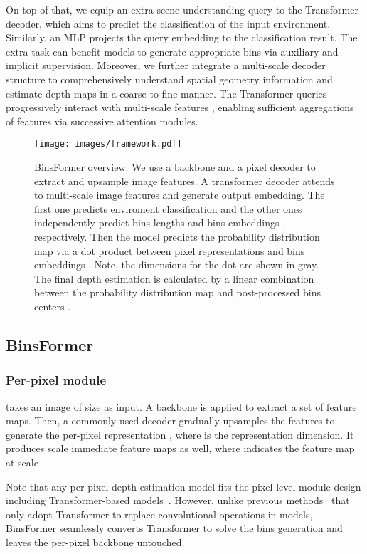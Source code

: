 \documentclass[runningheads]{llncs}
\begin{document}
On top of that, we equip an extra scene understanding query to the Transformer decoder, which aims to predict the classification of the input environment. Similarly, an MLP projects the query embedding to the classification result. The extra task can benefit models to generate appropriate bins via auxiliary and implicit supervision. Moreover, we further integrate a multi-scale decoder structure to comprehensively understand spatial geometry information and estimate depth maps in a coarse-to-fine manner. The Transformer queries progressively interact with multi-scale features , enabling sufficient aggregations of features via successive attention modules.

\begin{figure}[t]
    \texttt{[image: images/framework.pdf]}
    \caption{BinsFormer overview: We use a backbone and a pixel decoder to extract and upsample image features. A transformer decoder attends to multi-scale image features  and generate  output embedding. The first one predicts enviroment classification and the other  ones independently predict  bins lengths  and  bins embeddings , respectively. Then the model predicts the probability distribution map  via a dot product between pixel representations  and bins embeddings . Note, the dimensions for the dot  are shown in gray. The final depth estimation is calculated by a linear combination between the probability distribution map  and post-processed  bins centers .}
    \label{fig::framework}
\end{figure}

\subsection{BinsFormer}

\subsubsection{Per-pixel module} takes an image of size  as input. A backbone is applied to extract a set of feature maps. Then, a commonly used decoder gradually upsamples the features to generate the per-pixel representation , where  is the representation dimension. It produces  scale immediate feature maps  as well, where  indicates the feature map at scale . 

Note that any per-pixel depth estimation model fits the pixel-level module design including Transformer-based models~\cite{ranftl2021dpt,yang2021transdepth,bhat2021adabins}. However, unlike previous methods~\cite{ranftl2021dpt,yang2021transdepth} that only adopt Transformer to replace convolutional operations in models, BinsFormer seamlessly converts Transformer to solve the bins generation and leaves the per-pixel backbone untouched.
\end{document}
